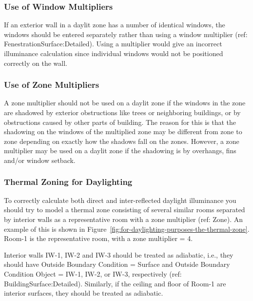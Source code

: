 \subsubsection{Use of Window Multipliers}\label{use-of-window-multipliers}

If an exterior wall in a daylit zone has a number of identical windows, the windows should be entered separately rather than using a window multiplier (ref: FenestrationSurface:Detailed). Using a multiplier would give an incorrect illuminance calculation since individual windows would not be positioned correctly on the wall.

\subsubsection{Use of Zone Multipliers}\label{use-of-zone-multipliers}

A zone multiplier should not be used on a daylit zone if the windows in the zone are shadowed by exterior obstructions like trees or neighboring buildings, or by obstructions caused by other parts of building. The reason for this is that the shadowing on the windows of the multiplied zone may be different from zone to zone depending on exactly how the shadows fall on the zones. However, a zone multiplier may be used on a daylit zone if the shadowing is by overhangs, fins and/or window setback.

\subsubsection{Thermal Zoning for Daylighting}\label{thermal-zoning-for-daylighting}

To correctly calculate both direct and inter-reflected daylight illuminance you should try to model a thermal zone consisting of several similar rooms separated by interior walls as a representative room with a zone multiplier (ref: Zone). An example of this is shown in Figure~\ref{fig:for-daylighting-purposes-the-thermal-zone}. Room-1 is the representative room, with a zone multiplier = 4.

Interior walls IW-1, IW-2 and IW-3 should be treated as adiabatic, i.e., they should have Outside Boundary Condition = Surface and Outside Boundary Condition Object = IW-1, IW-2, or IW-3, respectively (ref: BuildingSurface:Detailed). Similarly, if the ceiling and floor of Room-1 are interior surfaces, they should be treated as adiabatic.

